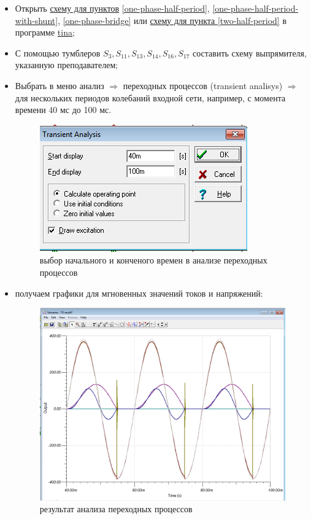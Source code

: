\begin{itemize}
	\item Открыть \href{https://github.com/trot-t/power_electronics_virtual_labs/blob/master/power_electronic_L2.TSC}{схему 
		для пунктов} \ref{one-phase-half-period}, \ref{one-phase-half-period-with-shunt}, \ref{one-phase-bridge} 
		или \href{https://github.com/trot-t/power_electronics_virtual_labs/blob/master/power_electronics_L2_tap.TSC}{схему 
		для пункта \ref{two-half-period}}
		в программе \href{http://www.ti.com/tool/TINA-TI}{tina};
\item С помощью тумблеров $S_3,S_{11},S_{13},S_{14},S_{16}, S_{17}$ составить схему выпрямителя, указанную преподавателем;
\item Выбрать в меню анализ $\Rightarrow$ переходных процессов (transient analisys) $\Rightarrow$ для нескольких периодов колебаний 
	входной сети, 
	например, с момента времени 40 мс до 100 мс.
\begin{figure}[!ht]
\centering
\includegraphics[scale=0.4]{analisys}
\caption{выбор начального и конченого времен в анализе переходных процессов}
\label{analisys}
\end{figure}	

\item получаем графики для мгновенных значений токов и напряжений: 
\begin{figure}[!ht]
\centering
\includegraphics[scale=0.3]{result}
\caption{результат анализа переходных процессов}
\label{result}
\end{figure}	


\end{itemize}
